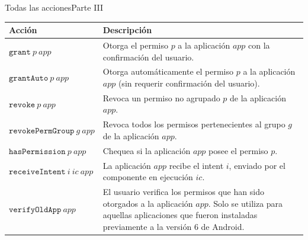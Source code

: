 \documentclass[pdf]{beamer} %
\begin{document}
\begin{frame}{Todas las acciones}{Parte III}
    \fontsize{9pt}{11pt}\selectfont
    \begin{table}
        \begin{tabularx}{\linewidth}{|l X|}
            \hline
            \textbf{Acción}                   & \textbf{Descripción}                                                                                                                                                                   \\
            \hline
            $\mathtt{grant}~p~app$            & Otorga el permiso $p$ a la aplicación $app$ con la confirmación del usuario.                                                                                                           \\
            \hline
            $\mathtt{grantAuto}~p~app$        & Otorga automáticamente el permiso $p$ a la aplicación $app$ (sin requerir confirmación del usuario).                                                                                   \\
            \hline
            $\mathtt{revoke}~p~app$           & Revoca un permiso no agrupado $p$ de la aplicación $app$.                                                                                                                              \\
            \hline
            $\mathtt{revokePermGroup}~g~app$  & Revoca todos los permisos pertenecientes al grupo $g$ de la aplicación $app$.                                                                                                          \\
            \hline
            $\mathtt{hasPermission}~p~app$    & Chequea si la aplicación $app$ posee el permiso $p$.                                                                                                                                   \\
            \hline
            $\mathtt{receiveIntent}~i~ic~app$ & La aplicación $app$ recibe el intent $i$, enviado por el componente en ejecución $ic$.                                                                                                 \\
            \hline
            $\mathtt{verifyOldApp}~app$       & El usuario verifica los permisos que han sido otorgados a la aplicación $app$. Solo se utiliza para aquellas aplicaciones que fueron instaladas previamente a la versión 6 de Android. \\
            \hline
        \end{tabularx}
    \end{table}
\end{frame}
\end{document}
